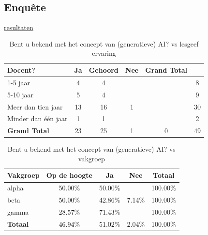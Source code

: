 \documentclass[12pt]{article}
\begin{document}
\pagebreak
\subsection{Enquête}
\href{https://docs.google.com/spreadsheets/d/10Z6uwL6eRiDsPIC6HQ5hyizUN8RciJKFSDRZBGiKdDI}{resultaten}

\noindent
\begin{table}[H]
    \caption{Bent u bekend met het concept van (generatieve) AI? vs lesgeef ervaring}
    \begin{tabular}{l c c c c c}
        \toprule
        \textbf{Docent?} & \textbf{Ja} & \textbf{Gehoord} & \textbf{Nee} & \textbf{Grand Total} \\
        \midrule
        1-5 jaar      & 4  & 4  &   &   & 8  \\
        5-10 jaar     & 5  & 4  &   &   & 9  \\
        Meer dan tien jaar & 13 & 16 & 1 &   & 30 \\
        Minder dan één jaar & 1  & 1  &   &   & 2  \\
        \midrule
        \textbf{Grand Total} & 23 & 25 & 1 & 0 & 49 \\
        \bottomrule
    \end{tabular}
\end{table}

\noindent
\begin{table}[H]
    \caption{Bent u bekend met het concept van (generatieve) AI? vs vakgroep}

    \begin{tabular}{l c c c c}
        \toprule
        \textbf{Vakgroep} & \textbf{Op de hoogte} & \textbf{Ja} & \textbf{Nee} & \textbf{Totaal} \\
        \midrule
        alpha & 50.00\% & 50.00\% &  & 100.00\% \\
        beta  & 50.00\% & 42.86\% & 7.14\% & 100.00\% \\
        gamma & 28.57\% & 71.43\% &  & 100.00\% \\
        \midrule
        \textbf{Totaal} & 46.94\% & 51.02\% & 2.04\% & 100.00\% \\
        \bottomrule
    \end{tabular}
\end{table}
\end{document}
